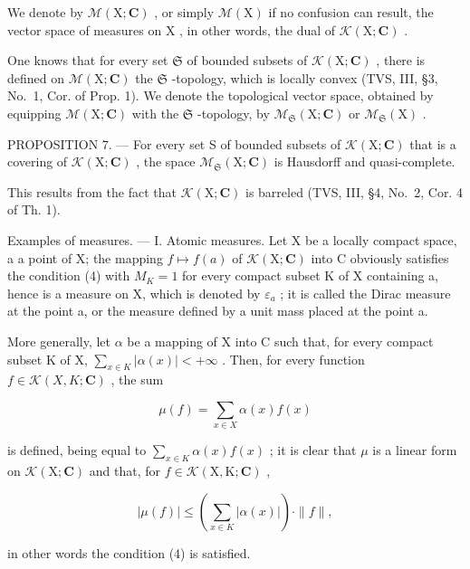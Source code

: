We denote by \(\mathcal{M}(\mathrm{X};\mathbf{C})\) , or simply \(\mathcal{M}(\mathrm{X})\) if no confusion can result, the vector space of measures on \(\mathrm{X}\) , in other words, the dual of \(\mathcal{K}(\mathrm{X};\mathbf{C})\) .

One knows that for every set \(\mathfrak{S}\) of bounded subsets of \(\mathcal{K}(\mathrm{X};\mathbf{C})\) , there is defined on \(\mathcal{M}(\mathrm{X};\mathbf{C})\) the \(\mathfrak{S}\) -topology, which is locally convex (TVS, III, §3, No.~1, Cor. of Prop. 1). We denote the topological vector space, obtained by equipping \(\mathcal{M}(\mathrm{X};\mathbf{C})\) with the \(\mathfrak{S}\) -topology, by \(\mathcal{M}_{\mathfrak{S}}(\mathrm{X};\mathbf{C})\) or \(\mathcal{M}_{\mathfrak{S}}(\mathrm{X})\) .

PROPOSITION 7. --- For every set S of bounded subsets of \(\mathcal{K}(\mathrm{X};\mathbf{C})\) that is a covering of \(\mathcal{K}(\mathrm{X};\mathbf{C})\) , the space \(\mathcal{M}_{\mathfrak{S}}(\mathrm{X};\mathbf{C})\) is Hausdorff and quasi-complete.

This results from the fact that \(\mathcal{K}(\mathrm{X};\mathbf{C})\) is barreled (TVS, III, §4, No.~2, Cor. 4 of Th. 1).

Examples of measures. --- I. Atomic measures. Let X be a locally compact space, a a point of X; the mapping \(f \mapsto f(a)\) of \(\mathcal{K}(\mathrm{X};\mathbf{C})\) into C obviously satisfies the condition (4) with \(M_{K} = 1\) for every compact subset K of X containing a, hence is a measure on X, which is denoted by \(\varepsilon_{a}\) ; it is called the Dirac measure at the point a, or the measure defined by a unit mass placed at the point a.

More generally, let \(\alpha\) be a mapping of X into C such that, for every compact subset K of X, \(\sum_{x\in K}|\alpha(x)|<+\infty\) . Then, for every function \(f\in\mathcal{K}(X,K;\mathbf{C})\) , the sum

\[
\mu (f) = \sum_ {x \in X} \alpha (x) f (x)
\]

is defined, being equal to \(\sum_{x\in K}\alpha (x)f(x)\) ; it is clear that \(\mu\) is a linear form on \(\mathcal{K}(\mathrm{X};\mathbf{C})\) and that, for \(f\in \mathcal{K}(\mathrm{X},\mathrm{K};\mathbf{C})\) ,

\[
| \mu (f) | \leqslant \left(\sum_ {x \in K} | \alpha (x) |\right) \cdot \| f \|,
\]

in other words the condition (4) is satisfied.


